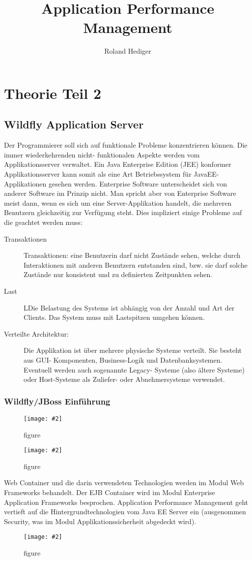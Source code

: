 \documentclass[a4paper,10pt]{scrreprt}
\title{Application Performance Management}
\author{Roland Hediger}
\newcommand{\pic}[2][figure]{\begin{figure}[h]
 \centering
 \texttt{[image: \#2]}
 \caption{#1}
\end{figure}
}
\begin{document}
\pagestyle{fancy}
 \maketitle
 \tableofcontents
\lstlistoflistings

\part{Theorie Teil 2}

\chapter{Wildfly Application Server} %
\label{cha:wildfly_application_server}
Der Programmierer soll sich auf funktionale Probleme konzentrieren können. Die immer wiederkehrenden nicht-
funktionalen Aspekte werden vom Applikationsserver verwaltet. Ein Java Enterprise Edition (JEE) konformer
Applikationsserver kann somit als eine Art Betriebssystem für JavaEE-Applikationen gesehen werden.
Enterprise Software unterscheidet sich von anderer Software im Prinzip nicht. Man spricht aber von Enterprise
Software meist dann, wenn es sich um eine Server-Applikation handelt, die mehreren Benutzern gleichzeitig zur
Verfügung steht. Dies impliziert einige Probleme auf die geachtet werden muss:
\begin{description}
	\item[Transaktionen] Transaktionen: eine Benutzerin darf nicht Zustände sehen, welche durch Interaktionen mit anderen
Benutzern entstanden sind, bzw. sie darf solche Zustände nur konsistent und zu definierten Zeitpunkten
sehen.
\item[Last]  LDie Belastung des Systems ist abhängig von der Anzahl und Art der Clients. Das System muss mit
Lastspitzen umgehen können.
\item[Verteilte Architektur:] Die Applikation ist über mehrere physische Systeme verteilt. Sie besteht aus GUI-
Komponenten, Business-Logik und Datenbanksystemen. Eventuell werden auch sogenannte Legacy-
Systeme (also ältere Systeme) oder Host-Systeme als Zuliefer- oder Abnehmersysteme verwendet.
\end{description}
\section{Wildfly/JBoss Einführung} %
\label{sec:wildfly_jboss}

\pic{sjee.png}
\pic{jeeu.png}
 Web Container und die darin verwendeten Technologien werden im Modul Web Frameworks behandelt. Der EJB
Container wird im Modul Enterprise Application Frameworks besprochen. Application Performance Management
geht vertieft auf die Hintergrundtechnologien vom Java EE Server ein (ausgenommen Security, was im Modul
Applikationssicherheit abgedeckt wird).
\pic{jeeimp.png}
\end{document}

